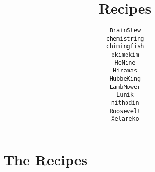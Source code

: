 \documentclass[12pt,a4paper,twoside]{book}
\title{Recipes}
\author{\texttt{BrainStew}\\%
		\texttt{chemistring}\\%
		\texttt{chimingfish}\\%
		\texttt{ekimekim}\\%
		\texttt{HeNine}\\%
		\texttt{Hiramas}\\%
		\texttt{HubbeKing}\\%
		\texttt{LambMower}\\%
		\texttt{Lunik}\\%
		\texttt{mithodin}\\%
		\texttt{Roosevelt}\\%
		\texttt{Xelareko}
}
\begin{document}
	\maketitle
	\tableofcontents
	\clearpage

	\chapter{The Recipes}

	
    \clearpage
	
    \clearpage
    
	\clearpage
	
	\clearpage
	
    \clearpage
    
	\clearpage
	
	\clearpage
	
	\clearpage
	
	\clearpage
	
	\clearpage
	
	\clearpage
	
	\clearpage
	
	\clearpage
	
	\clearpage
	
	\clearpage
	
	\clearpage
	
	\clearpage
	
	\clearpage
	
	\clearpage
	
	\clearpage
	
	\clearpage
	
	\clearpage
	
	\clearpage
	
	\clearpage
	
	\clearpage
	
	\clearpage
	
	\clearpage
	
	\clearpage
	
	\clearpage
	
	\clearpage
	
	\clearpage
	
	\clearpage
	
	\clearpage
	
	\clearpage
	
	\clearpage
	
\end{document}
